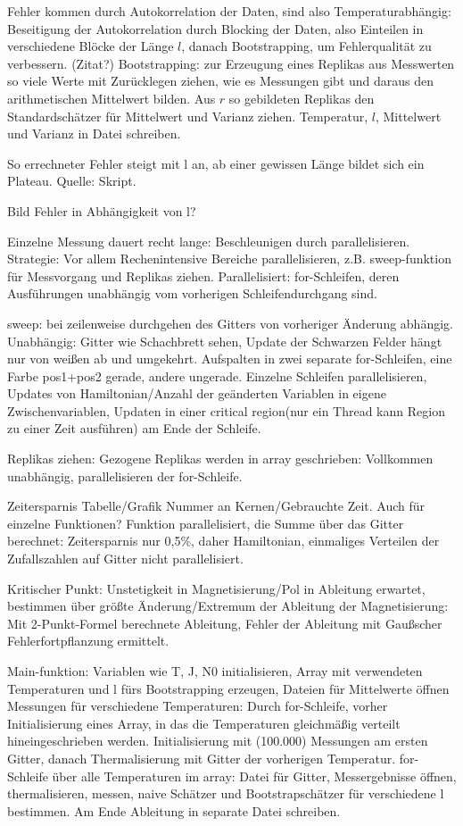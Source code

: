 \documentclass{scrreprt}
\begin{document}
	Fehler kommen durch Autokorrelation der Daten, sind also Temperaturabhängig: Beseitigung der Autokorrelation durch Blocking der Daten, also Einteilen in verschiedene Blöcke der Länge $l$, danach Bootstrapping, um Fehlerqualität zu verbessern. (Zitat?)
	Bootstrapping: zur Erzeugung eines Replikas aus Messwerten so viele Werte mit Zurücklegen ziehen, wie es Messungen gibt und daraus den arithmetischen Mittelwert bilden. Aus $r$ so gebildeten Replikas den Standardschätzer für Mittelwert und Varianz ziehen. Temperatur, $l$, Mittelwert und Varianz in Datei schreiben.
	
	So errechneter Fehler steigt mit l an, ab einer gewissen Länge bildet sich ein Plateau. Quelle: Skript.
	
	Bild Fehler in Abhängigkeit von l?
	
	Einzelne Messung dauert recht lange: Beschleunigen durch parallelisieren. 
	Strategie: Vor allem Rechenintensive Bereiche parallelisieren, z.B. sweep-funktion für Messvorgang und Replikas ziehen.
	Parallelisiert: for-Schleifen, deren Ausführungen unabhängig vom vorherigen Schleifendurchgang sind.
	
	sweep: bei zeilenweise durchgehen des Gitters von vorheriger Änderung abhängig.
	Unabhängig: Gitter wie Schachbrett sehen, Update der Schwarzen Felder hängt nur von weißen ab und umgekehrt. Aufspalten in zwei separate for-Schleifen, eine Farbe pos1+pos2 gerade, andere ungerade. Einzelne Schleifen parallelisieren, Updates von Hamiltonian/Anzahl der geänderten Variablen in eigene Zwischenvariablen, Updaten in einer critical region(nur ein Thread kann Region zu einer Zeit ausführen) am Ende der Schleife.
	
	Replikas ziehen: Gezogene Replikas werden in array geschrieben: Vollkommen unabhängig, parallelisieren der for-Schleife.
	
	Zeitersparnis Tabelle/Grafik Nummer an Kernen/Gebrauchte Zeit. Auch für einzelne Funktionen?
	Funktion parallelisiert, die Summe über das Gitter berechnet: Zeitersparnis nur 0,5\%, daher Hamiltonian, einmaliges Verteilen der Zufallszahlen auf Gitter nicht parallelisiert.
	
	Kritischer Punkt: Unstetigkeit in Magnetisierung/Pol in Ableitung erwartet, bestimmen über größte Änderung/Extremum der Ableitung der Magnetisierung: Mit 2-Punkt-Formel berechnete Ableitung, Fehler der Ableitung mit Gaußscher Fehlerfortpflanzung ermittelt.
	
	
	Main-funktion: Variablen wie T, J, N0 initialisieren, Array mit verwendeten Temperaturen und l fürs Bootstrapping erzeugen, Dateien für Mittelwerte öffnen
	Messungen für verschiedene Temperaturen: Durch for-Schleife, vorher Initialisierung eines Array, in das die Temperaturen gleichmäßig verteilt hineingeschrieben werden.
	Initialisierung mit (100.000) Messungen am ersten Gitter, danach Thermalisierung mit Gitter der vorherigen Temperatur.
	for-Schleife über alle Temperaturen im array: Datei für Gitter, Messergebnisse öffnen, thermalisieren, messen, naive Schätzer und Bootstrapschätzer für verschiedene l bestimmen.
	Am Ende Ableitung in separate Datei schreiben.
	
\end{document}
